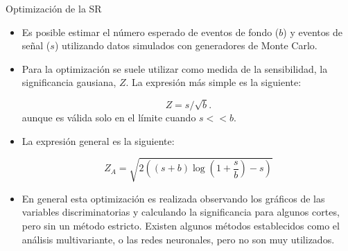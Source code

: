 \documentclass[center,10pt,cm]{beamer}
\begin{document}
\begin{frame}{Optimizaci\'on de la SR}

  \begin{itemize}\itemsep0.2cm
  \item Es posible estimar el n\'umero esperado de eventos de fondo ($b$) y eventos
    de se\~nal ($s$) utilizando datos simulados con generadores de Monte Carlo.

  \item Para la optimizaci\'on se suele utilizar como medida de la sensibilidad, la
    significancia gausiana, $Z$. La expresi\'on m\'as simple es la siguiente:

    \begin{equation*}
      Z = s/\sqrt{b}.
    \end{equation*}
    aunque es v\'alida solo en el l\'imite cuando $s << b$.

    \item La expresi\'on general es la siguiente:

    \begin{equation*}
      Z_A = \sqrt{2\left( (s + b) \log \left( 1 + \frac{s}{b} \right) - s \right)}
    \end{equation*}

  \item En general esta optimizaci\'on es realizada observando los gr\'aficos de las variables
    discriminatorias y calculando la significancia para algunos cortes, pero sin un
    m\'etodo estricto. Existen algunos m\'etodos establecidos como
    el an\'alisis multivariante, o las redes neuronales, pero no son muy utilizados.


  \end{itemize}

\end{frame}
\end{document}
